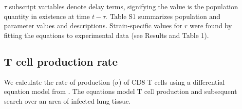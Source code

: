 \documentclass[10pt]{article}
\begin{document}
$\tau$ subscript variables denote delay terms, signifying the value is the population quantity in existence at time $t - \tau$.  Table S1 summarizes population and parameter values and descriptions.  Strain-specific values for $r$ were found by fitting the equations to experimental data (see Results and Table 1).





\subsection{T cell production rate}

We calculate the rate of production ($\sigma$) of CD8 T cells using a differential equation model from \cite{Miao2010}.  The equations model T cell production and subsequent search over an area of infected lung tissue.
\end{document}
